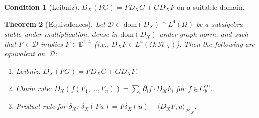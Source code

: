 \documentclass[11pt,a4paper]{article}
\theoremstyle{plain}
\newtheorem{theorem}{Theorem}[section]
\theoremstyle{definition}
\newtheorem{condition}[theorem]{Condition}
\theoremstyle{remark}
\newcommand{\dom}{\mathrm{dom}}
\newcommand{\HX}{\mathcal{H}_X}
\begin{document}
\begin{condition}[Leibniz]\label{cond:leibniz}
$D_X(FG) = FD_XG + GD_XF$ on a suitable domain.
\end{condition}

\begin{theorem}[Equivalences]\label{thm:equiv}
Let $\mathcal{D} \subset \dom(D_X)\cap L^4(\Omega)$ be a subalgebra stable under multiplication, dense in $\dom(D_X)$ under graph norm, and such that $F \in \mathcal{D}$ implies $F \in \mathbb{D}^{1,4}$ (i.e., $D_XF \in L^4(\Omega;\HX)$). Then the following are equivalent on~$\mathcal{D}$:
\begin{enumerate}[label=\textup{(\alph*)}]
\item \textup{Leibniz:} $D_X(FG) = FD_XG + GD_XF$.
\item \textup{Chain rule:} $D_X(f(F_1,\ldots,F_n)) = \sum_i\partial_if\cdot D_XF_i$ for $f \in C_b^\infty$.
\item \textup{Product rule for $\delta_X$:} $\delta_X(Fu) = F\delta_X(u) - \langle D_XF, u\rangle_{\HX}$.
\end{enumerate}
\end{theorem}
\end{document}
